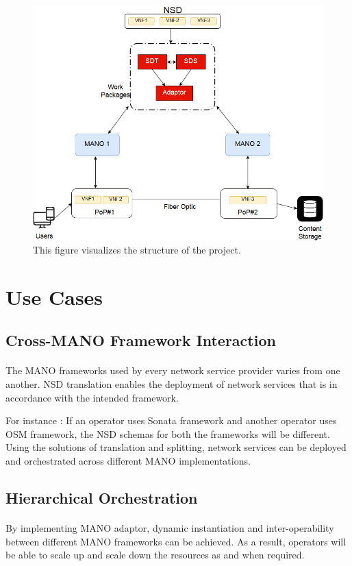 \begin{figure}
	\centering
	\includegraphics[width=0.7\linewidth]{figures/Structure_Updated1}
	\caption{This figure visualizes the structure of the project. }
	\label{fig:structureupdated1}
\end{figure}


\newpage
\section{Use Cases}

\subsection{Cross-MANO Framework Interaction}
\paragraph{}

The MANO frameworks used by every network service provider varies from one another. NSD translation enables the deployment of network services that is in accordance with the intended framework.

For instance : If an operator uses Sonata framework and another operator uses OSM framework, the NSD schemas for both the frameworks will be different. Using the solutions of translation and splitting, network services can be deployed and orchestrated across different MANO implementations.

\subsection{Hierarchical Orchestration}
\paragraph{}
By implementing MANO adaptor, dynamic instantiation and inter-operability between different MANO frameworks can be achieved. As a result, operators will be able to scale up and scale down the resources as and when required.

